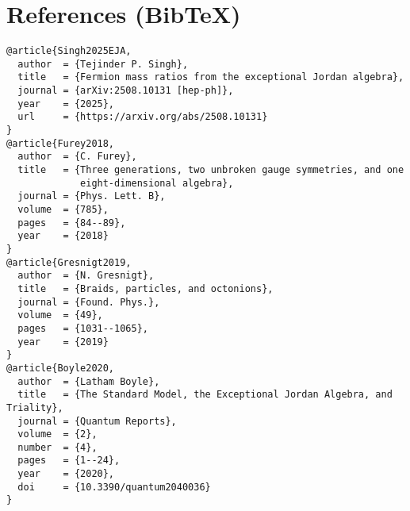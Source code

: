 \documentclass[11pt]{article}
\begin{document}
  \section*{References (Bib\TeX)}
      \begin{verbatim}
@article{Singh2025EJA,
  author  = {Tejinder P. Singh},
  title   = {Fermion mass ratios from the exceptional Jordan algebra},
  journal = {arXiv:2508.10131 [hep-ph]},
  year    = {2025},
  url     = {https://arxiv.org/abs/2508.10131}
}
@article{Furey2018,
  author  = {C. Furey},
  title   = {Three generations, two unbroken gauge symmetries, and one
             eight-dimensional algebra},
  journal = {Phys. Lett. B},
  volume  = {785},
  pages   = {84--89},
  year    = {2018}
}
@article{Gresnigt2019,
  author  = {N. Gresnigt},
  title   = {Braids, particles, and octonions},
  journal = {Found. Phys.},
  volume  = {49},
  pages   = {1031--1065},
  year    = {2019}
}
@article{Boyle2020,
  author  = {Latham Boyle},
  title   = {The Standard Model, the Exceptional Jordan Algebra, and Triality},
  journal = {Quantum Reports},
  volume  = {2},
  number  = {4},
  pages   = {1--24},
  year    = {2020},
  doi     = {10.3390/quantum2040036}
}
      \end{verbatim}




  \ifdefined\standalonechapter\else
  
\end{document}
